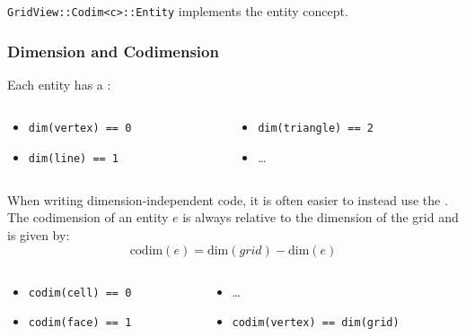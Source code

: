 \documentclass[aspectratio=169,11pt]{beamer}
\theoremstyle{definition}
\begin{document}
\begin{frame}
  \pause
  \lstinline!GridView::Codim<c>::Entity!
  implements the entity concept.

\end{frame}

\begin{frame}[fragile]
  \frametitle{Dimension and Codimension}
  Each entity has a :
  \begin{columns}
    \begin{column}{0.5\textwidth}
      \begin{itemize}
      \item \lstinline!dim(vertex) == 0!
      \item \lstinline!dim(line) == 1!
      \end{itemize}
    \end{column}
    \begin{column}{0.5\textwidth}
      \begin{itemize}
      \item \lstinline!dim(triangle) == 2!
      \item \dots
      \end{itemize}
    \end{column}
    \end{columns}
  \pause\vspace*{2em}
  When writing dimension-independent code, it is often easier to instead use the .\\[1em]
  The codimension of an entity $e$ is always relative to the dimension of the grid and is given by:
  \begin{equation*}
    \mathrm{codim}(e) = \mathrm{dim}(grid) - \mathrm{dim}(e)
  \end{equation*}
  \begin{columns}
    \begin{column}{0.5\textwidth}
      \begin{itemize}
      \item \lstinline!codim(cell) == 0!
      \item \lstinline!codim(face) == 1!
      \end{itemize}
    \end{column}
    \begin{column}{0.5\textwidth}
      \begin{itemize}
      \item \dots
      \item \lstinline!codim(vertex) == dim(grid)!
      \end{itemize}
    \end{column}
    \end{columns}

\end{frame}
\end{document}
